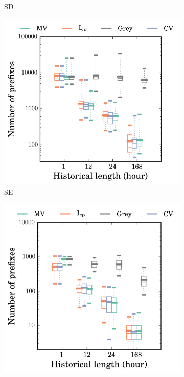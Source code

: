 \begin{figure}
\begin{subfigure}[b]{0.48\textwidth}
                \caption{SD}
                \label{fig:churn_sd}
        \end{subfigure}
        \begin{subfigure}[b]{0.48\textwidth}
                \includegraphics[width=\textwidth]{gfx/chap2/grey_churn_box_method_compare_fs_se.png}
                \caption{SE}
                \label{fig:churn_se}
        \end{subfigure}
        \begin{subfigure}[b]{0.48\textwidth}
                \includegraphics[width=\textwidth]{gfx/chap2/grey_churn_box_method_compare_fs_sf.png}

\end{subfigure}
\end{figure}
